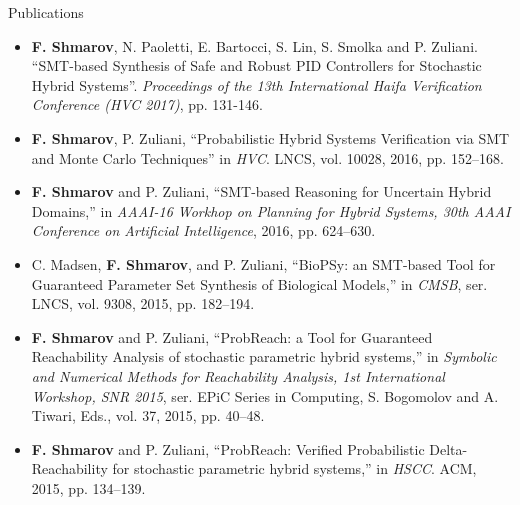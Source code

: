 \documentclass{resume} %
\begin{document}
\begin{rSection}{Publications}
\begin{itemize}

	\item {\bf F. Shmarov}, N. Paoletti, E. Bartocci, S. Lin, S. Smolka and P. Zuliani. 
	``SMT-based Synthesis of Safe and Robust PID Controllers for Stochastic Hybrid Systems''.
	{\em Proceedings of the 13th International Haifa Verification Conference (HVC 2017)}, pp. 131-146.

	\item {\bf F. Shmarov}, P. Zuliani, ``Probabilistic Hybrid Systems Verification via 
	SMT and Monte Carlo Techniques'' in {\em HVC}. LNCS, vol. 10028, 2016,
	pp. 152--168.

	\item {\bf F. Shmarov} and P. Zuliani, ``SMT-based Reasoning for Uncertain Hybrid Domains,'' 
	in {\em AAAI-16 Workhop on Planning for Hybrid Systems, 
	30th AAAI Conference on Artificial Intelligence}, 2016, pp. 624--630.

	\item C. Madsen, {\bf F. Shmarov}, and P. Zuliani, ``BioPSy: an SMT-based Tool for 
	Guaranteed Parameter Set Synthesis of Biological Models,'' in {\em CMSB},
	ser. LNCS, vol. 9308, 2015, pp. 182--194.

	\item {\bf F. Shmarov} and P. Zuliani, ``ProbReach: a Tool for 
	Guaranteed Reachability Analysis of stochastic parametric hybrid systems,''
	in {\em Symbolic and Numerical Methods for Reachability Analysis, 1st International Workshop, SNR 2015}, 
	ser. EPiC Series in Computing, S. Bogomolov and A. Tiwari, Eds., vol. 37, 2015, pp. 40--48.

	\item {\bf F. Shmarov} and P. Zuliani, ``ProbReach: Verified Probabilistic 
	Delta-Reachability for stochastic parametric hybrid systems,''
	in {\em HSCC}. ACM, 2015, pp. 134--139.

\end{itemize}
\end{rSection}
\end{document}
